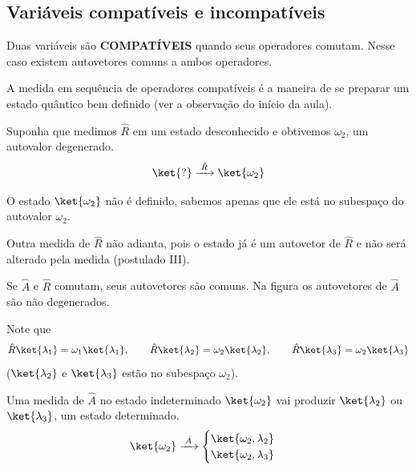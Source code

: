 \subsection*{Variáveis compatíveis e incompatíveis}

Duas variáveis são \textbf{COMPATÍVEIS} quando seus operadores comutam. Nesse caso existem autovetores comuns a ambos operadores.

A medida em sequência de operadores compatíveis é a maneira de se preparar um estado quântico bem definido (ver a observação do início da aula).

Suponha que medimos $\hat{R}$ em um estado desconhecido e obtivemos $\omega_2$, um autovalor degenerado.
\begin{equation}
    \ket{?} \xrightarrow{\;\hat{R}\;} \ket{\omega_2}
\label{eq:aula12_medida_degenerada}
\end{equation}

O estado $\ket{\omega_2}$ não é definido, sabemos apenas que ele está no subespaço do autovalor $\omega_2$.

Outra medida de $\hat{R}$ não adianta, pois o estado já é um autovetor de $\hat{R}$ e não será alterado pela medida (postulado III).

\begin{center}
\end{center}

Se $\hat{A}$ e $\hat{R}$ comutam, seus autovetores são comuns. Na figura os autovetores de $\hat{A}$ são não degenerados.

Note que
\begin{equation}
    \hat{R}\ket{\lambda_1} = \omega_1\ket{\lambda_1}, \qquad \hat{R}\ket{\lambda_2} = \omega_2\ket{\lambda_2}, \qquad \hat{R}\ket{\lambda_3} = \omega_2\ket{\lambda_3}
\label{eq:aula12_autovetores_comuns}
\end{equation}
($\ket{\lambda_2}$ e $\ket{\lambda_3}$ estão no subespaço $\omega_2$).

Uma medida de $\hat{A}$ no estado indeterminado $\ket{\omega_2}$ vai produzir $\ket{\lambda_2}$ ou $\ket{\lambda_3}$, um estado determinado.
\begin{equation}
    \ket{\omega_2} \xrightarrow{\;\hat{A}\;}
    \begin{cases}
        \ket{\omega_2,\lambda_2} \\
        \ket{\omega_2,\lambda_3}
    \end{cases}
\label{eq:aula12_medida_A_apos_R}
\end{equation}


